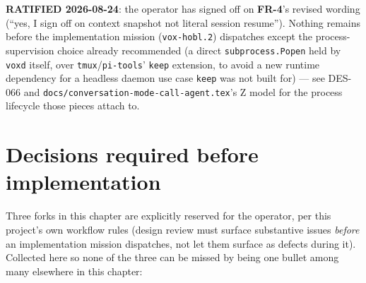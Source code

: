 \documentclass[a4paper,11pt]{report}
\newcommand{\fr}[1]{\textbf{FR-#1}}
\begin{document}
\textbf{RATIFIED 2026-08-24}: the operator has signed off on \fr{4}'s
revised wording (``yes, I sign off on context snapshot not literal
session resume''). Nothing remains before the implementation mission
(\texttt{vox-hobl.2}) dispatches except the process-supervision choice
already recommended (a direct \texttt{subprocess.Popen} held by
\texttt{voxd} itself, over \texttt{tmux}/\texttt{pi-tools}' \texttt{keep}
extension, to avoid a new runtime dependency for a headless daemon use
case \texttt{keep} was not built for) --- see DES-066 and
\texttt{docs/conversation-mode-call-agent.tex}'s Z model for the process
lifecycle those pieces attach to.

\section{Decisions required before implementation}
\label{sec:decisions-required}

Three forks in this chapter are explicitly reserved for the operator, per
this project's own workflow rules (design review must surface substantive
issues \emph{before} an implementation mission dispatches, not let them
surface as defects during it). Collected here so none of the three can be
missed by being one bullet among many elsewhere in this chapter:
\end{document}
